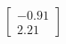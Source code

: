 \documentclass[preview]{standalone}
\begin{document}
\begin{align*}
\begin{bmatrix} -0.91 \\ 2.21 \end{bmatrix}
\end{align*}
\end{document}
